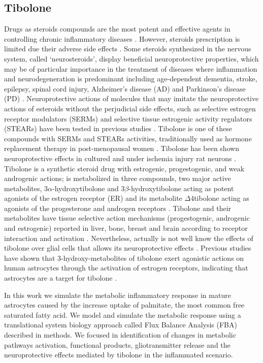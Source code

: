 \subsection*{Tibolone}
Drugs as steroids compounds are the most potent and effective agents in controlling chronic inflammatory diseases \cite{Laveti2013}. However, steroids prescription is limited due their adverse side effects \cite{Albertazzi1998}. Some steroids synthesized in the nervous system, called ‘neurosteroids’, display beneficial neuroprotective properties, which may be of particular importance in the treatment of diseases where inflammation and neurodegeneration is predominant including age-dependent dementia, stroke, epilepsy, spinal cord injury, Alzheimer’s disease (AD) and Parkinson’s disease (PD) \cite{Wojtal2006}. Neuroprotective actions of molecules that may imitate the neuroprotective actions of esteroids without the perjudicial side effects, such as selective estrogen receptor modulators (SERMs) and selective tissue estrogenic activity regulators (STEARs) have been tested in previous studies \cite{Kloosterboer2001,Sharma2006}. Tibolone is one of these compounds with SERMs and STEARs activities, traditionally used as hormone replacement therapy in post-menopausal women \cite{Timmer2002}. Tibolone has been shown neuroprotective effects in cultured and under ischemia injury rat neurons \cite{Altinoz2009}. Tibolone is a synthetic steroid drug with estrogenic, progestogenic, and weak androgenic actions; is metabolized in three compounds, two major active metabolites, 3$\alpha$-hydroxytibolone and 3$\beta$-hydroxytibolone acting as potent agonists of the estrogen receptor (ER) and its metabolite $\Delta$4tibolone acting as agonists of the progesterone and androgen receptors \cite{Kloosterboer2004}. Tibolone and their metabolites have tissue selective action mechanisms (progestogenic, androgenic and estrogenic) reported in liver, bone, breast and brain according to receptor interaction and activation \cite{Kloosterboer2001}. Nevertheless, actually is not well know the effects of tibolone over glial cells that allows its neuroprotective effects \cite{Avila-Rodriguez2014}. Previous studies have shown that 3-hydroxy-metabolites of tibolone exert agonistic actions on human astrocytes through the activation of estrogen receptors, indicating that astrocytes are a target for tibolone \cite{Altinoz2009}.

In this work we simulate the metabolic inflammatory response in mature astrocytes caused by the increase uptake of palmitate, the most common free saturated fatty acid. We model and simulate the metabolic response using a translational system biology approach called Flux Balance Analysis (FBA) described in methods. We focused in identification of changes in metabolic pathways activation, functional products, gliotransmitter release and the neuroprotective effects mediated by tibolone in the inflammated scenario.
